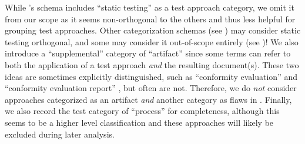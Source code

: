 
While \citet{IEEE2022}'s schema includes ``static testing'' as a test approach
category, we omit it from our scope as it seems non-orthogonal to the others
and thus less helpful for grouping test approaches. \ifnotpaper Other
    categorization schemas (see ) may consider static testing
    orthogonal, and some may consider it out-of-scope entirely (see
    )! \fi We also introduce a ``supplemental'' category of
``artifact'' since some terms can refer to both the
application of a test approach \emph{and} the resulting document(s).
\ifnotpaper
    These two ideas are sometimes explicitly distinguished, such as
    ``conformity evaluation'' and ``conformity evaluation report''
    \citep{ISO_IEC2014}, but often are not.
\fi
Therefore, we do \emph{not} consider approaches categorized as an artifact
\emph{and} another category as flaws in .
Finally, we also record the test category of ``process'' for completeness,
although this seems to be a higher level classification and these approaches
will likely be excluded during later analysis.

\ifnotpaper
    \begin{landscape}
        \begin{table*}[p]
            \ieeeCatsTable{}
        \end{table*}
    \end{landscape}
\fi


